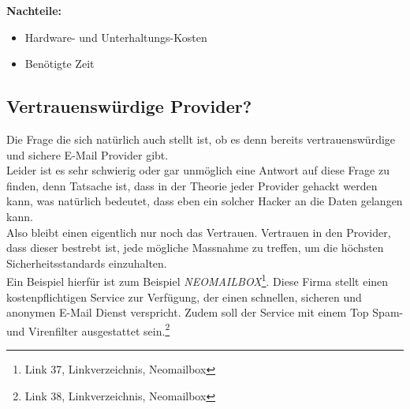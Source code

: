 \textbf{Nachteile:}
\begin{itemize}
    \item Hardware- und Unterhaltungs-Kosten
    \item Benötigte Zeit
\end{itemize}

\subsection{Vertrauenswürdige Provider?}
Die Frage die sich natürlich auch stellt ist, ob es denn bereits vertrauenswürdige und sichere E-Mail Provider gibt. \\
Leider ist es sehr schwierig oder gar unmöglich eine Antwort auf diese Frage zu finden, denn Tatsache ist, dass in der Theorie jeder Provider gehackt werden kann, was natürlich bedeutet, dass eben ein solcher Hacker an die Daten gelangen kann. \\
Also bleibt einen eigentlich nur noch das Vertrauen. Vertrauen in den Provider, dass dieser bestrebt ist, jede mögliche Massnahme zu treffen, um die höchsten Sicherheitsstandards einzuhalten. \\
Ein Beispiel hierfür ist zum Beispiel \textit{NEOMAILBOX}\footnote{Link 37, Linkverzeichnis, Neomailbox}. Diese Firma stellt einen kostenpflichtigen Service zur Verfügung, der einen schnellen, sicheren und anonymen E-Mail Dienst verspricht. Zudem soll der Service mit einem Top Spam- und Virenfilter ausgestattet sein.\footnote{Link 38, Linkverzeichnis, Neomailbox}
